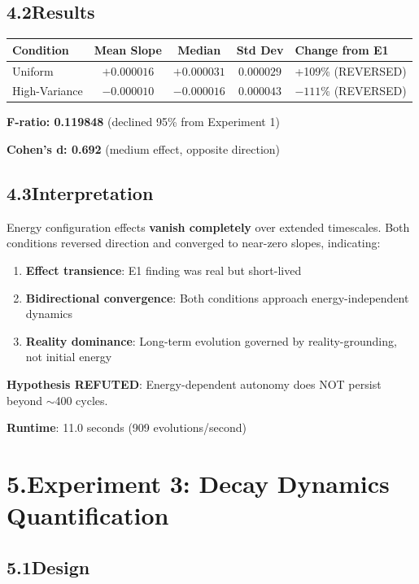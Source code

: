\documentclass[11pt]{article}
\begin{document}
\subsection*{4.2\quad Results}

\begin{tabular}{l c c c l}
\hline
Condition & Mean Slope & Median & Std Dev & Change from E1 \\
\hline
Uniform & $+0.000016$ & $+0.000031$ & $0.000029$ & +109\% (REVERSED) \\
High-Variance & $-0.000010$ & $-0.000016$ & $0.000043$ & $-111\%$ (REVERSED) \\
\hline
\end{tabular}

\noindent\textbf{F-ratio: 0.119848} (declined 95\% from Experiment 1)

\noindent\textbf{Cohen's d: 0.692} (medium effect, opposite direction)

\subsection*{4.3\quad Interpretation}

Energy configuration effects \textbf{vanish completely} over extended timescales. Both conditions reversed direction and converged to near-zero slopes, indicating:

\begin{enumerate}
    \item \textbf{Effect transience}: E1 finding was real but short-lived
    \item \textbf{Bidirectional convergence}: Both conditions approach energy-independent dynamics
    \item \textbf{Reality dominance}: Long-term evolution governed by reality-grounding, not initial energy
\end{enumerate}

\noindent\textbf{Hypothesis REFUTED}: Energy-dependent autonomy does NOT persist beyond $\sim$400 cycles.

\noindent\textbf{Runtime}: 11.0 seconds (909 evolutions/second)

\section*{5.\quad Experiment 3: Decay Dynamics Quantification}

\subsection*{5.1\quad Design}
\end{document}
